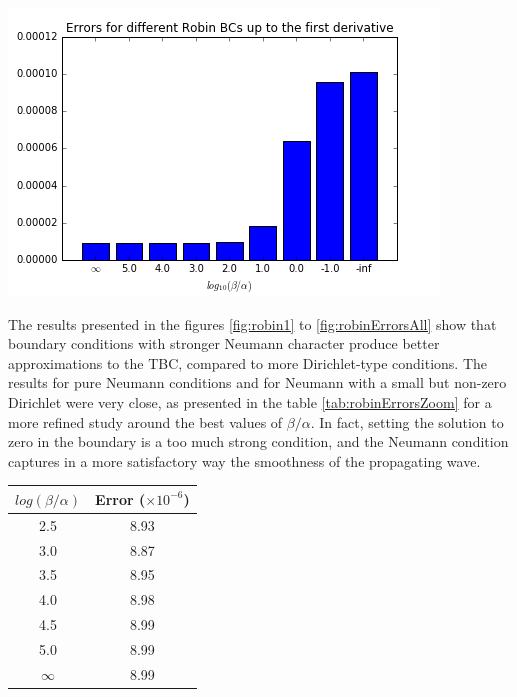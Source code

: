 \begin{center}
		\includegraphics[scale=.6]{figures/robinErrors1.png}
\end{center}


\indent The results presented in the figures \ref{fig:robin1} to \ref{fig:robinErrorsAll} show that boundary conditions with stronger Neumann character produce better approximations to the TBC, compared to more Dirichlet-type conditions. The results for pure Neumann conditions and for Neumann with a small but non-zero Dirichlet were very close, as presented in the table \ref{tab:robinErrorsZoom} for a more refined study around the best values of $\beta/\alpha$. In fact, setting the solution to zero in the boundary is a too much strong condition, and the Neumann condition captures in a more satisfactory way the smoothness of the propagating wave.

\begin{center}
		\begin{tabular}{c|c}
			$log(\beta/\alpha)$ & Error ($\times 10^{-6}$) \\
			\hline
			2.5 & 8.93\\
			3.0 & 8.87\\
			3.5 & 8.95\\
			4.0 & 8.98\\
			4.5 & 8.99\\
			5.0 & 8.99\\
			$\infty$ & 8.99	
		\end{tabular}
\end{center}

